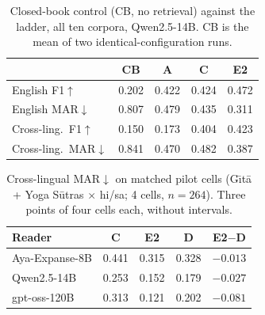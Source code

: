 \documentclass[11pt]{article}
\begin{document}
\begin{table}[h]
\centering\small
\begin{tabular}{@{}lcccc@{}}
\toprule
& \textbf{CB} & \textbf{A} & \textbf{C} & \textbf{E2} \\
\midrule
English F1$\uparrow$ & 0.202 & 0.422 & 0.424 & 0.472 \\
English MAR$\downarrow$ & 0.807 & 0.479 & 0.435 & 0.311 \\
Cross-ling.\ F1$\uparrow$ & 0.150 & 0.173 & 0.404 & 0.423 \\
Cross-ling.\ MAR$\downarrow$ & 0.841 & 0.470 & 0.482 & 0.387 \\
\bottomrule
\end{tabular}
\caption{Closed-book control (CB, no retrieval) against the ladder, all ten
corpora, Qwen2.5-14B. CB is the mean of two identical-configuration runs.}
\end{table}

\begin{table}[h]
\centering\small
\begin{tabular}{@{}lcccc@{}}
\toprule
\textbf{Reader} & \textbf{C} & \textbf{E2} & \textbf{D} & \textbf{E2$-$D} \\
\midrule
Aya-Expanse-8B & 0.441 & 0.315 & 0.328 & $-0.013$ \\
Qwen2.5-14B & 0.253 & 0.152 & 0.179 & $-0.027$ \\
gpt-oss-120B & 0.313 & 0.121 & 0.202 & $-0.081$ \\
\bottomrule
\end{tabular}
\caption{Cross-lingual MAR$\downarrow$ on matched pilot cells (G\={\i}t\={a} +
Yoga S\={u}tras $\times$ hi/sa; 4 cells, $n=264$). Three points of four cells
each, without intervals.}
\end{table}
\end{document}
